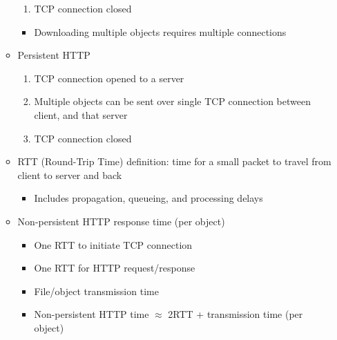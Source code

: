 \begin{itemize}
\begin{itemize}
\begin{enumerate}
          \item TCP connection closed

        \end{enumerate}

        \begin{itemize}

          \item Downloading multiple objects requires multiple connections

        \end{itemize}

      \item Persistent HTTP

        \begin{enumerate}

          \item TCP connection opened to a server

          \item Multiple objects can be sent over single TCP connection between client, and that server

          \item TCP connection closed

        \end{enumerate}

      \item RTT (Round-Trip Time) definition: time for a small packet to travel from client to server and back

        \begin{itemize}

          \item Includes propagation, queueing, and processing delays

        \end{itemize}

      \item Non-persistent HTTP response time (per object)

        \begin{itemize}

          \item One RTT to initiate TCP connection

          \item One RTT for HTTP request/response

          \item File/object transmission time

          \item Non-persistent HTTP time $\approx$ 2RTT + transmission time (per object)


\end{itemize}
\end{itemize}
\end{itemize}
